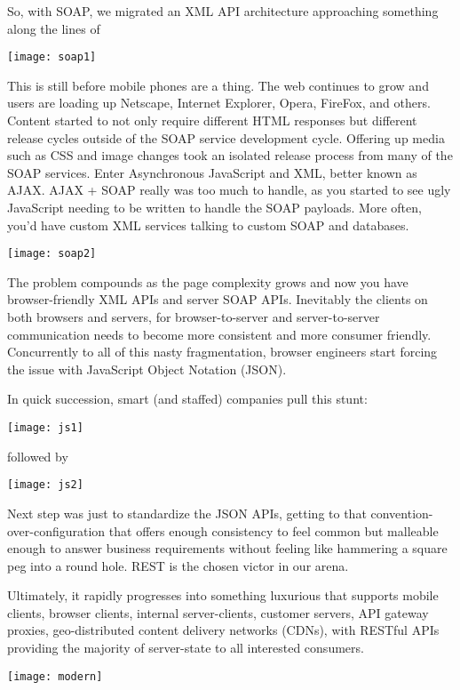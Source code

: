 \begin{minipage}{\linewidth}
So, with SOAP, we migrated an XML API architecture approaching something along the lines of

\texttt{[image: soap1]}

\end{minipage}

This is still before mobile phones are a thing.  The web continues to grow and users are loading up Netscape, Internet Explorer, Opera, FireFox, and others.  Content started to not only require different HTML responses but different release cycles outside of the SOAP service development cycle.  Offering up media such as CSS and image changes took an isolated release process from many of the SOAP services.  Enter Asynchronous JavaScript and XML, better known as AJAX.  AJAX + SOAP really was too much to handle, as you started to see ugly JavaScript needing to be written to handle the SOAP payloads.  More often, you'd have custom XML services talking to custom SOAP and databases.

\texttt{[image: soap2]}

The problem compounds as the page complexity grows and now you have browser-friendly XML APIs and server SOAP APIs.  Inevitably the clients on both browsers and servers, for browser-to-server and server-to-server communication needs to become more consistent and more consumer friendly.  Concurrently to all of this nasty fragmentation, browser engineers start forcing the issue with JavaScript Object Notation (JSON).

In quick succession, smart (and staffed) companies pull this stunt:

\texttt{[image: js1]}

followed by

\texttt{[image: js2]}

Next step was just to standardize the JSON APIs, getting to that convention-over-configuration that offers enough consistency to feel common but malleable enough to answer business requirements without feeling like hammering a square peg into a round hole.  REST is the chosen victor in our arena.

Ultimately, it rapidly progresses into something luxurious that supports mobile clients, browser clients, internal server-clients, customer servers, API gateway proxies, geo-distributed content delivery networks (CDNs), with RESTful APIs providing the majority of server-state to all interested consumers.

\texttt{[image: modern]}

